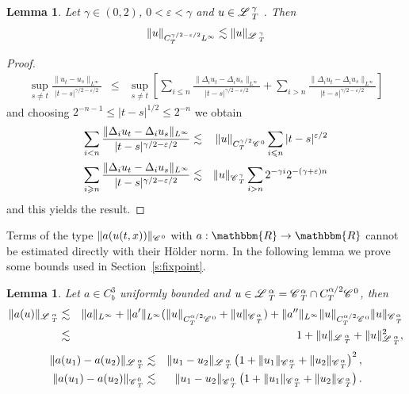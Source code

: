 \documentclass{amsart}
\newtheorem{lemma}[theorem]{Lemma}
\theoremstyle{remark}
\theoremstyle{definition}
\newcommand{\CC}{\mathscr{C} \hspace{.1em}}
\newcommand{\LL}{\mathscr{L} \hspace{.2em}}
\begin{document}
\begin{lemma}
  \label{l:interpol} Let $\gamma \in (0, 2)$, $0 < \varepsilon < \gamma$ and
  $u \in \LL^{\gamma}_T$ . Then
  \[ \| u \|_{C_T^{\gamma / 2 - \varepsilon / 2} L^{\infty}} \lesssim \| u
     \|_{\LL^{\gamma}_T} \]
\end{lemma}

\begin{proof}
  
  \begin{eqnarray*}
    \sup_{s \neq t} \frac{\| u_t - u_s \|_{L^{\infty}}}{| t - s |^{\gamma / 2
    - \varepsilon / 2}} & \leqslant & \sup_{s \neq t} [\sum_{i \leqslant n}
    \frac{\| \Delta_i u_t - \Delta_i u_s \|_{L^{\infty}}}{| t - s |^{\gamma /
    2 - \varepsilon / 2}} + \sum_{i > n} \frac{\| \Delta_i u_t - \Delta_i u_s
    \|_{L^{\infty}}}{| t - s |^{\gamma / 2 - \varepsilon / 2}}]
  \end{eqnarray*}
  and choosing $2^{- n - 1} \leqslant | t - s |^{1 / 2} \leqslant 2^{- n}$ we
  obtain
  \begin{eqnarray*}
    \sum_{i < n} \frac{\| \Delta_i u_t - \Delta_i u_s \|_{L^{\infty}}}{| t - s
    |^{\gamma / 2 - \varepsilon / 2}} & \lesssim & \| u \|_{C_T^{\gamma / 2}
    \CC^0} \sum_{i \leqslant n} | t - s |^{\varepsilon / 2}\\
    \sum_{i \geqslant n} \frac{\| \Delta_i u_t - \Delta_i u_s
    \|_{L^{\infty}}}{| t - s |^{\gamma / 2 - \varepsilon / 2}} & \lesssim & \|
    u \|_{\CC^{\gamma}_T} \sum_{i > n} 2^{- \gamma i} 2^{- (\gamma +
    \varepsilon) n}
  \end{eqnarray*}
  and this yields the result.
\end{proof}

Terms of the type $\| a (u (t, x)) \|_{\CC^0}$ with $a : \mathbbm{R}
\rightarrow \mathbbm{R}$ cannot be estimated directly with their H{\"o}lder
norm. In the following lemma we prove some bounds used in
Section~\ref{s:fixpoint}.

\begin{lemma}
  Let $a \in C^3_b$ uniformly bounded and $u \in \LL^{\alpha}_T =
  \CC^{\alpha}_T \cap C_T^{\alpha / 2} \CC^0$, then
  \begin{eqnarray*}
    \| a (u) \|_{\LL^{\alpha}_T} & \lesssim & \| a \|_{L^{\infty}} + \| a'
    \|_{L^{\infty}} (\| u \|_{C_T^{\alpha / 2} \CC^0} + \| u
    \|_{\CC^{\alpha}_{_T}}) + \| a'' \|_{L^{\infty}} \| u \|_{C_T^{\alpha / 2}
    \CC^0} \| u \|_{\CC^{\alpha}_{_T}}\\
    & \lesssim & 1 + \| u \|_{\LL^{\alpha}_T} + \| u \|^2_{\LL_T^{\alpha}},
  \end{eqnarray*}
  \begin{eqnarray*}
    \| a (u_1) - a (u_2) \|_{\LL_T^{\alpha}} & \lesssim & \| u_1 - u_2
    \|_{\LL^{\alpha}_T} \left( 1 + \| u_1 \|_{\CC^{\alpha}_T} + \| u_2
    \|_{\CC^{\alpha}_T} \right)^2,\\
    \| a (u_1) - a (u_2) \|_{\CC_T^0} & \lesssim & \| u_1 - u_2 \|_{\CC^0_T}
    \left( 1 + \| u_1 \|_{\CC^{\alpha}_T} + \| u_2 \|_{\CC^{\alpha}_T} \right)
    .
  \end{eqnarray*}
\end{lemma}
\end{document}
